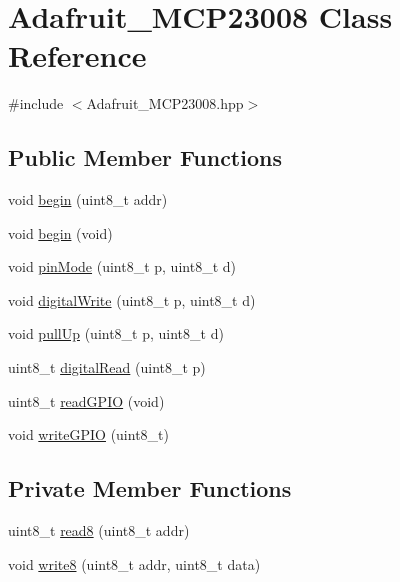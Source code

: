 \hypertarget{class_adafruit___m_c_p23008}{}\section{Adafruit\+\_\+\+M\+C\+P23008 Class Reference}
\label{class_adafruit___m_c_p23008}


{\ttfamily \#include $<$Adafruit\+\_\+\+M\+C\+P23008.\+hpp$>$}

\subsection*{Public Member Functions}
\begin{DoxyCompactItemize}
\item 
void \hyperlink{class_adafruit___m_c_p23008_a8314a25b377985de7ce5e3b5e7455372}{begin} (uint8\+\_\+t addr)
\item 
void \hyperlink{class_adafruit___m_c_p23008_af3987b6fb1535161dc7ba6b7128728ab}{begin} (void)
\item 
void \hyperlink{class_adafruit___m_c_p23008_a4b0ecc269a2f8a7a837d6f9bece20caf}{pin\+Mode} (uint8\+\_\+t p, uint8\+\_\+t d)
\item 
void \hyperlink{class_adafruit___m_c_p23008_a3e68d889e4ae288b73055dd0e685e3e3}{digital\+Write} (uint8\+\_\+t p, uint8\+\_\+t d)
\item 
void \hyperlink{class_adafruit___m_c_p23008_a5e2c6d20e8a3e81af47bb9ec47d707b1}{pull\+Up} (uint8\+\_\+t p, uint8\+\_\+t d)
\item 
uint8\+\_\+t \hyperlink{class_adafruit___m_c_p23008_a51d5f3149d92245cca9b3429456edce5}{digital\+Read} (uint8\+\_\+t p)
\item 
uint8\+\_\+t \hyperlink{class_adafruit___m_c_p23008_a83c2886cdd47924a628f5bd42560748b}{read\+G\+P\+IO} (void)
\item 
void \hyperlink{class_adafruit___m_c_p23008_a03b271a8a8e9bb8b8289a57cea5d328f}{write\+G\+P\+IO} (uint8\+\_\+t)
\end{DoxyCompactItemize}
\subsection*{Private Member Functions}
\begin{DoxyCompactItemize}
\item 
uint8\+\_\+t \hyperlink{class_adafruit___m_c_p23008_af291bdb83da9d2ea2b5fd640e9610ffb}{read8} (uint8\+\_\+t addr)
\item 
void \hyperlink{class_adafruit___m_c_p23008_ae87dc8ba103bb45ff558d1802a9eab73}{write8} (uint8\+\_\+t addr, uint8\+\_\+t data)
\end{DoxyCompactItemize}
